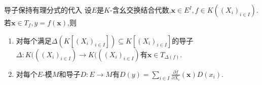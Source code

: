 \begin{proposition}{导子保持有理分式的代入}{}
	设$E$是$K$-含幺交换结合代数,$\mathbf{x}\in E^{I},f\in K((X_{i})_{i\in I})$.若$\mathbf{x}\in T_{f},y=f\left(\mathbf{x}\right)$,则
	\begin{enumerate}
		\item 对每个满足$\Delta\left(K[(X_{i})_{i\in I}]\right)\subseteq K[(X_{i})_{i\in I}]$的导子$\Delta:K(((X_{i})_{i\in I})\to K(((X_{i})_{i\in I})$有$\mathbf{x}\in T_{\Delta\left(f\right)}$.
		\item 对每个$E$-模$M$和导子$D:E\to M$有$D\left(y\right)=\sum\limits_{i\in I}\frac{\partial f}{\partial X_{i}}\left(\mathbf{x}\right)D\left(x_{i}\right)$.
	\end{enumerate}
\end{proposition}


















































































